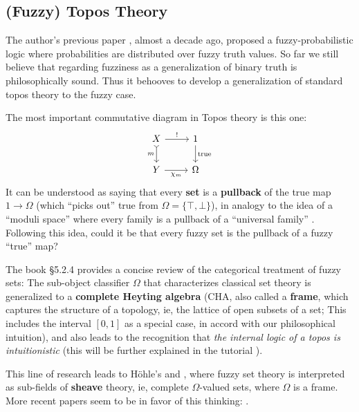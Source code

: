 \documentclass[orivec]{llncs}
\begin{document}
\subsection{(Fuzzy) Topos Theory}

The author's previous paper \cite{Yan2012}, almost a decade ago, proposed a fuzzy-probabilistic logic where probabilities are distributed over fuzzy truth values.  So far we still believe that regarding fuzziness as a generalization of binary truth is philosophically sound.  Thus it behooves to develop a generalization of standard topos theory to the fuzzy case.  

The most important commutative diagram in Topos theory is this one:
\begin{equation}
\label{eqn:subobject-classifier}
\begin{tikzcd}[column sep = normal]
X \arrow[r, "!"] \arrow[d, tail, swap, "m"] & 1 \arrow[d, "\mathrm{true}"] \\
Y \arrow[r, swap, "\chi_m"] & \Omega
\end{tikzcd}
\end{equation}
It can be understood as saying that every \textbf{set} is a \textbf{pullback} of the true map $1 \rightarrow \Omega$ (which ``picks out'' true from $\Omega = \{ \top, \bot \}$), in analogy to the idea of a ``moduli space'' where every family is a pullback of a ``universal family'' \cite{Schlichenmaier2010} \cite{Harris2006}.  Following this idea, could it be that every fuzzy set is the pullback of a fuzzy ``true'' map?  

The book \cite{Belohlavek2017} \S5.2.4 provides a concise review of the categorical treatment of fuzzy sets:  The sub-object classifier $\Omega$ that characterizes classical set theory is generalized to a \textbf{complete Heyting algebra} (CHA, also called a \textbf{frame}, which captures the structure of a topology, ie, the lattice of open subsets of a set;  This includes the interval $[0,1]$ as a special case, in accord with our philosophical intuition), and also leads to the recognition that \textit{the internal logic of a topos is intuitionistic} (this will be further explained in the tutorial \cite{Yan2021}).

This line of research leads to H\"{o}hle's \cite{Hohle2007} and \cite{Hohle2007b}, where fuzzy set theory is interpreted as sub-fields of \textbf{sheave} theory, ie, complete $\Omega$-valued sets, where $\Omega$ is a frame.  More recent papers seem to be in favor of this thinking: \cite{Jardine2019} \cite{Vickers2010}.
\end{document}
